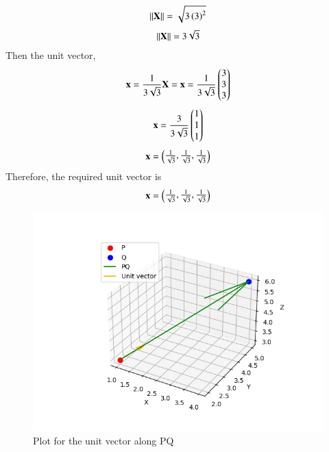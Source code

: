 \documentclass[journal]{IEEEtran}
\begin{document}
         \begin{align}
             \left\lVert\mathbf{X}\right\rVert=\sqrt{3\left(3\right)^2}
         \end{align}
         \begin{align}
             \left\lVert\mathbf{X}\right\rVert=3\sqrt{3}
         \end{align}
         Then the unit vector,\\
         \begin{align}
             \mathbf{x}=\frac{1}{3\sqrt{3}}\mathbf{X}=\mathbf{x}=\frac{1}{3\sqrt{3}}\begin{pmatrix}3\\3\\3\end{pmatrix}
         \end{align}
         \begin{align}
             \mathbf{x}=\frac{3}{3\sqrt{3}}\begin{pmatrix}1\\1\\1\end{pmatrix}
         \end{align}
         \begin{align}
             \mathbf{x}=\begin{pmatrix}\frac{1}{\sqrt{3}},\frac{1}{\sqrt{3}},\frac{1}{\sqrt{3}}\end{pmatrix}
         \end{align}
         Therefore, the required unit vector is\\
         \begin{align}
             \mathbf{x}=\begin{pmatrix}\frac{1}{\sqrt{3}},\frac{1}{\sqrt{3}},\frac{1}{\sqrt{3}}\end{pmatrix}
         \end{align}
         \begin{figure}
             \centering
             \includegraphics[width=1\columnwidth]{figs/fig21.png}
             \caption{Plot for the unit vector along PQ }
             \label{fig:fig21}
         \end{figure}
         
\end{document}
